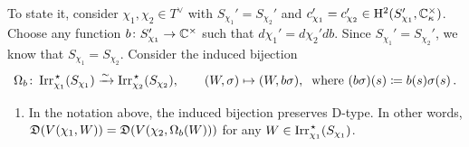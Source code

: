 To state it, consider $\chi_1, \chi_2 \in T^{\vee}$ with $S_{\chi_1}' = S_{\chi_2}'$ and $c_{\chi_1}' = c_{\chi_2}' \in \mathrm{H}^2(S_{\chi_1}', {\mathbb C}^{\times}_{\kappa})$.
Choose any function $b \colon S_{\chi_1}' \rightarrow {\mathbb C}^{\times}$ such that $d \chi_1' = d \chi_2' db$. Since $S_{\chi_1}' = S_{\chi_2}'$, we know that $S_{\chi_1} = S_{\chi_2}$.
Consider the induced bijection
\[
\Omega_b \colon \operatorname{Irr}_{\chi_1}^{\hspace{0.1em} \star}(S_{\chi_1}) \xrightarrow{\sim} \operatorname{Irr}_{\chi_2}^{\hspace{0.1em} \star}(S_{\chi_2}), \qquad (W, \sigma) \mapsto (W, b\sigma), \: \text{ where }  (b\sigma)(s) \coloneqq b(s) \sigma(s) \, .
\]
\begin{enumerate}[label=\textnormal{(\Roman*)}]
\item  
In the notation above, the induced bijection preserves D-type. In other words, ${\mathfrak D}(V(\chi_1, W)) = {\mathfrak D}(V(\chi_2, \Omega_b(W)))$ for any $W \in \operatorname{Irr}_{\chi_1}^{\hspace{0.1em} \star}(S_{\chi_1})$.
\end{enumerate}
